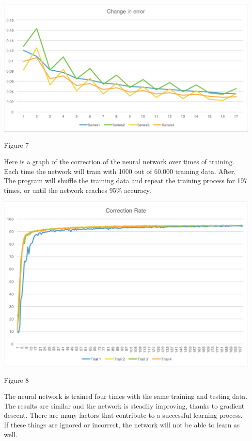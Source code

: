 \documentclass[]{article}
\begin{document}
\begin{multicols}{2}
\centerline{\includegraphics[width=1\linewidth]{graph1} }
\centerline{Figure 7}
\vspace{0.5cm}
Here is a graph of the correction of the neural network over times of training. Each time the network will train with 1000 out of 60,000 training data. After, The program will shuffle the training data and repeat the training process for 197 times, or until the network reaches 95\% accuracy. 

\centerline{\includegraphics[width=1\linewidth]{graph2}}
\centerline {Figure 8}
\vspace{0.3cm}

The neural network is trained four times with the same training and testing data. The results are similar and the network is steadily improving, thanks to gradient descent. There are many factors that contribute to a successful learning process. If these things are ignored or incorrect, the network will not be able to learn as well. 


\end{multicols}
\end{document}
